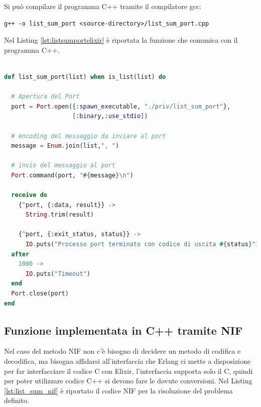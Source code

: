 Si può compilare il programma C++ tramite il compilatore gcc:
\begin{lstlisting}[language=none]
g++ -o list_sum_port <source-directory>/list_sum_port.cpp
\end{lstlisting}

Nel Listing \ref{lst:listsumportelixir} è riportata la funzione
che comunica con il programma C++.

\begin{lstlisting}[language=elixir,captionpos=b,
	caption={Funzione list\_sum\_port()},
	label={lst:listsumportelixir}]

def list_sum_port(list) when is_list(list) do

  # Apertura del Port
  port = Port.open({:spawn_executable, "./priv/list_sum_port"},
                   [:binary,:use_stdio])

  # encoding del messaggio da inviare al port
  message = Enum.join(list,", ")

  # invio del messaggio al port
  Port.command(port, "#{message}\n")

  receive do
    {^port, {:data, result}} ->
      String.trim(result)

    {^port, {:exit_status, status}} ->
      IO.puts("Processo port terminato con codice di uscita #{status}")
  after
    1000 ->
      IO.puts("Timeout")
  end
  Port.close(port)
end
\end{lstlisting}


\newpage
\subsection{Funzione implementata in C++ tramite NIF}\label{subsec:NIF_cpp}

Nel caso del metodo NIF non c'è bisogno di decidere un
metodo di codifica e decodifica, ma bisogna affidarsi
all'interfaccia che Erlang ci mette a disposizione per
far interfacciare il codice C con Elixir, l'interfaccia
supporta solo il C, quindi per poter utilizzare codice C++
si devono fare le dovute conversioni.
Nel Listing \ref{lst:list_sum_nif} è riportato il codice
NIF per la risoluzione del problema definito.


